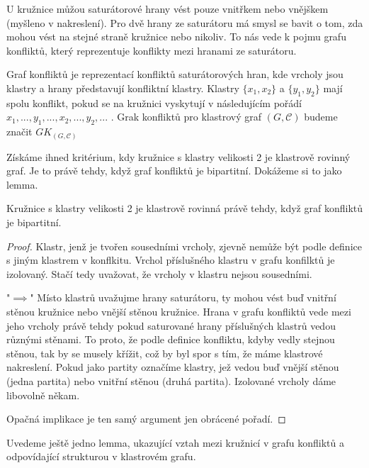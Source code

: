 U kružnice můžou saturátorové hrany vést pouze vnitřkem nebo vnějškem (myšleno v nakreslení). Pro dvě hrany ze saturátoru má smysl se bavit o tom, zda mohou vést na stejné straně kružnice nebo nikoliv. To nás vede k pojmu grafu konfliktů, který reprezentuje konflikty mezi hranami ze saturátoru. 

\begin{defn}
Graf konfliktů je reprezentací konfliktů saturátorových hran, kde vrcholy jsou klastry a hrany představují konfliktní klastry. Klastry $\{x_1, x_2\}$ a $\{y_1, y_2\}$ mají spolu konflikt, pokud se na kružnici vyskytují v následujícím pořádí $x_1 , ..., y_1, ..., x_2, ..., y_2, ...$ . Grak konfliktů pro klastrový graf $(G,\mathcal C)$ budeme značit $GK_{(G,\mathcal C)}$
\end{defn}

Získáme ihned kritérium, kdy kružnice s klastry velikosti 2 je klastrově rovinný graf. Je to právě tehdy, když graf konfliktů je bipartitní. Dokážeme si to jako lemma.

\begin{lemma}\label{lemma_ekv_graf_konf_kl_rov}Kružnice s klastry velikosti 2 je klastrově rovinná právě tehdy, když graf konfliktů je bipartitní.
\end{lemma}
\begin{proof}
Klastr, jenž je tvořen sousedními vrcholy, zjevně nemůže být podle definice s jiným klastrem v konflkitu. Vrchol příslušného klastru v grafu konfilktů je izolovaný. Stačí tedy uvažovat, že vrcholy v klastru nejsou sousedními.

"$\implies$"
Místo klastrů uvažujme hrany saturátoru, ty mohou vést buď vnitřní stěnou kružnice nebo vnější stěnou kružnice. Hrana v grafu konfliktů vede mezi jeho vrcholy právě tehdy pokud saturované hrany příslušných klastrů vedou různými stěnami. To proto, že podle definice konfliktu, kdyby vedly stejnou stěnou, tak by se musely křížit, což by byl spor s tím, že máme klastrové nakreslení. Pokud jako partity označíme klastry, jež vedou buď vnější stěnou (jedna partita) nebo vnitřní stěnou (druhá partita). Izolované vrcholy dáme libovolně někam.

Opačná implikace je ten samý argument jen obrácené pořadí.
\end{proof}

Uvedeme ještě jedno lemma, ukazující vztah mezi kružnicí v grafu konfliktů a odpovídající strukturou v klastrovém grafu.


